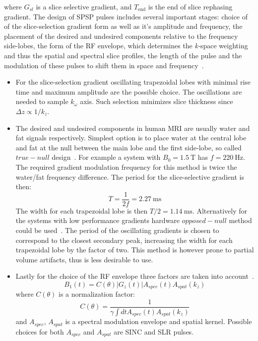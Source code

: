 where $G_{sl}$ is a slice selective gradient, and $T_{\mathrm{end}}$ is the end of slice rephasing gradient. 
The design of SPSP pulses includes several important stages: choice of of the slice-selection gradient form as well as it's amplitude and frequency, the placement of the desired and undesired components relative to the frequency side-lobes, the form of the RF envelope, which determines the \mbox{\textit{k-}space} weighting and thus the spatial and spectral slice profiles, the length of the pulse and the modulation of these pulses to shift them in space and frequency~\cite{RNDT24}. 
	\begin{itemize}
	\item For the slice-selection gradient oscillating trapezoidal lobes with minimal rise time and maximum amplitude are the possible choice. The oscillations are needed to sample $k_{\omega}$ axis. Such selection minimizes slice thickness since $\Delta z \propto 1/k_{z}$. 
	\item The desired and undesired components in human MRI are usually water and fat signals respectively. Simplest option is to place water at the central lobe and fat at the null between the main lobe and the first side-lobe, so called $\mathit{true-null}$ design~\cite{Meyer:1990cv}. For example a system with $B_0 = \SI{1.5}{\tesla}$ has $f = \SI{220}{\hertz}$. The required gradient modulation frequency for this method is twice the water/fat frequency difference. The period for the slice-selective gradient is then:
\begin{equation}\label{eq: SPSP_period}
	T=\frac{1}{2f}=\SI{2.27}{\milli\second}
\end{equation}
The width for each trapezoidal lobe is then $T/2 = \SI{1.14}{\milli\second}$. 
Alternatively for the systems with low performance gradients hardware $\mathit{opposed-null}$ method could be used~\cite{RNDT24}. 
The period of the oscillating gradients is chosen to correspond to the closest secondary peak, increasing the width for each trapezoidal lobe by the factor of two. 
This method is however prone to partial volume artifacts, thus is less desirable to use.
\item Lastly for the choice of the RF envelope three factors are taken into account~\cite{RNDT24}.
\begin{equation}\label{eq: SPSP_RF}
B_1(t)=C(\theta)|G_z(t)|A_{spec}(t)A_{spat}(k_z)
\end{equation}
where $C(\theta)$ is a normalization factor:
\begin{equation}\label{eq: SPSP_C}
	C(\theta)=\frac{1}{\gamma\displaystyle\int dt A_{spec}(t)A_{spat}(k_z)}
\end{equation}
and $A_{spec}$, $A_{spat}$ is a spectral modulation envelope and spatial kernel. 
Possible choices for both $A_{spec}$ and $A_{spat}$ are SINC and SLR pulses.
\end{itemize}
